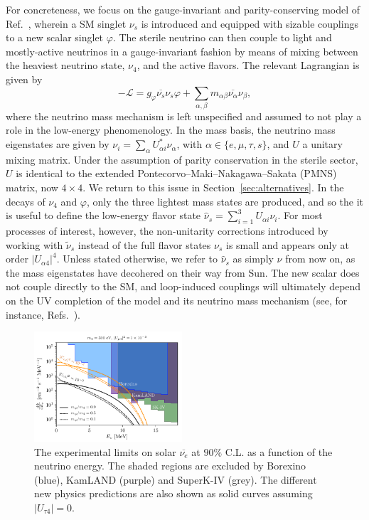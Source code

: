\documentclass[
reprint,
superscriptaddress,
showpacs,
preprintnumbers,
nofootinbib,
nobibnotes,
amsmath,
amssymb, 
aps,
prd,
floatfix
]{revtex4-1}
\newcommand{\refsec}[1]{Section~\ref{#1}}
\renewcommand{\phi}{\varphi}
\begin{document}
For concreteness, we focus on the gauge-invariant and parity-conserving model of Ref.~\cite{Dentler:2019dhz}, wherein a SM singlet $\nu_s$ is introduced and equipped with sizable couplings to a new scalar singlet $\phi$. The sterile neutrino can then couple to light and mostly-active neutrinos in a gauge-invariant fashion by means of mixing between the heaviest neutrino state, $\nu_4$, and the active flavors. The relevant Lagrangian is given by
\begin{equation}\label{eq:Lscalar}
 - \mathscr{L} = g_\phi \overline{{\nu_s}} {\nu_s} \phi + \sum_{\alpha,\beta} m_{\alpha \beta} \overline{{\nu_\alpha}} {\nu_\beta}, 
\end{equation}
where the neutrino mass mechanism is left unspecified and assumed to not play a role in the low-energy phenomenology. In the mass basis, the neutrino mass eigenstates are given by $\nu_i = \sum_\alpha U_{\alpha i}^* \nu_\alpha$, with $\alpha\in \{e,\mu,\tau,s\}$, and $U$ a unitary mixing matrix. Under the assumption of parity conservation in the sterile sector, $U$ is identical to the extended Pontecorvo–Maki–Nakagawa–Sakata (PMNS) matrix, now $4\times4$. We return to this issue in \refsec{sec:alternatives}. In the decays of $\nu_4$ and $\phi$, only the three lightest mass states are produced, and so the it is useful to define the low-energy flavor state $\hat{\nu}_s = \sum_{i=1}^3 U_{\alpha i} \nu_i$. For most processes of interest, however, the non-unitarity corrections introduced by working with $\widetilde{\nu}_s$ instead of the full flavor states $\nu_s$ is small and appears only at order $|U_{\alpha4}|^4$. Unless stated otherwise, we refer to $\hat{\nu}_s$ as simply $\nu$ from now on, as the mass eigenstates have decohered on their way from Sun. The new scalar does not couple directly to the SM, and loop-induced couplings will ultimately depend on the UV completion of the model and its neutrino mass mechanism (see, for instance, Refs.~\cite{Chikashige:1980ui,Xu:2020qek}).
%
\begin{figure}[t]
    \centering
    \includegraphics[width=0.49\textwidth]{Fluxlimit_scalar.pdf}
    \caption{The experimental limits on solar $\overline{\nu_e}$ at $90\%$ C.L. as a function of the neutrino energy. The shaded regions are excluded by Borexino (blue), KamLAND (purple) and SuperK-IV (grey). The different new physics predictions are also shown as solid curves assuming $|U_{\tau 4}|=0$. \label{fig:fluxlimits}}
\end{figure}
\end{document}
